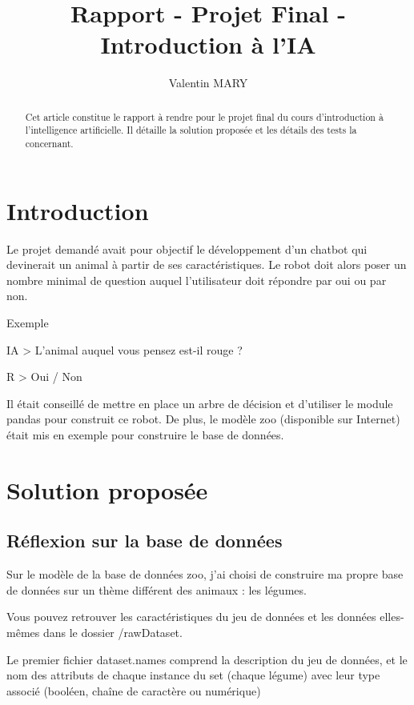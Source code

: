 \documentclass{report}
\title{Rapport - Projet Final - Introduction à l'IA}
\author{Valentin MARY}
\begin{document}
\maketitle

\begin{abstract}
Cet article constitue le rapport à rendre pour le projet final du cours d'introduction à l'intelligence artificielle. Il détaille la solution proposée et les détails des tests la concernant.
\end{abstract}

\section{Introduction}

Le projet demandé avait pour objectif le développement d'un chatbot qui devinerait un animal à partir de ses caractéristiques. Le robot doit alors poser un nombre minimal de question auquel l'utilisateur doit répondre par oui ou par non. 

Exemple

IA > L'animal auquel vous pensez est-il rouge ?

R > Oui / Non

Il était conseillé de mettre en place un arbre de décision et d'utiliser le module pandas pour construit ce robot. De plus, le modèle zoo (disponible sur Internet) était mis en exemple pour construire le base de données.

\section{Solution proposée}

\subsection{Réflexion sur la base de données}

Sur le modèle de la base de données zoo, j'ai choisi de construire ma propre base de données sur un thème différent des animaux : les légumes. 

Vous pouvez retrouver les caractéristiques du jeu de données et les données elles-mêmes dans le dossier /rawDataset.

Le premier fichier dataset.names comprend la description du jeu de données, et le nom des attributs de chaque instance du set (chaque légume) avec leur type associé (booléen, chaîne de caractère ou numérique) 
\end{document}
